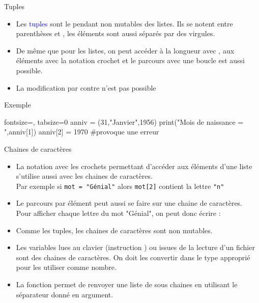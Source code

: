 \documentclass[10pt]{beamer}
\begin{document}
\begin{frame}[fragile]{\Ctitle}{\stitle}
	\begin{alertblock}{Tuples}
		\begin{itemize}
			\item<1-> Les \textcolor{blue}{tuples} sont le pendant non mutables des listes. Ils se notent entre parenthèses \kw{(} et \kw{)}, les éléments sont aussi séparés par des virgules.
			\item<1-> De même que pour les listes, on peut accéder à la longueur avec , aux éléments avec la notation crochet et le parcours avec une boucle  est aussi possible.
			\item<1-> La modification par contre n'est pas possible
		\end{itemize}
	\end{alertblock}
	\begin{exampleblock}{Exemple}
		\begin{codepython*}{fontsize=\small, tabsize=0}
			anniv = (31,"Janvier",1956)
			print("Mois de naissance = ",anniv[1])
			anniv[2] = 1970 #provoque une erreur
		\end{codepython*}
	\end{exampleblock}
\end{frame}

\begin{frame}[fragile]{\Ctitle}{\stitle}
	\begin{alertblock}{Chaines de caractères}
		\begin{itemize}
			\item<1-> La notation avec les crochets permettant d'accéder aux éléments d'une liste s'utilise aussi avec les chaines de caractères. \\
				\onslide<2-> Par exemple si \texttt{mot = "Génial"} alors \texttt{mot[2]} contient la lettre \texttt{"n"}
			\item<3-> Le parcours par élément peut aussi se faire sur une chaine de caractères. \\
				\onslide<4-> Pour afficher chaque lettre du mot "Génial", on peut donc écrire :
				\onslide<5->
			\item<6-> Comme les tuples, les chaines de caractères sont non mutables.
			\item<7-> \textcolor{blue}{\small \important} Les variables lues au clavier (instruction ) ou issues de la lecture d'un fichier sont des chaines de caractères. On doit les convertir dans le type approprié pour les utiliser comme nombre.
			\item<8-> La fonction  permet de renvoyer une liste de sous chaines en utilisant le séparateur donné en argument.
		\end{itemize}
	\end{alertblock}
\end{frame}
\end{document}
